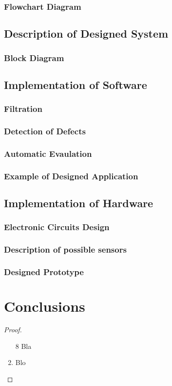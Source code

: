 \documentclass[twoside]{ctuthesis}
\theoremstyle{plain}
\theoremstyle{definition}
\theoremstyle{note}
\begin{document}
\subsection{Flowchart Diagram}
\section{Description of Designed System}
\subsection{Block Diagram}
\section{Implementation of Software}
\subsection{Filtration}
\subsection{Detection of Defects}
\subsection{Automatic Evaulation}
\subsection{Example of Designed Application}
\section{Implementation of Hardware}
\subsection{Electronic Circuits Design}
\subsection{Description of possible sensors}
\subsection{Designed Prototype}
\chapter{Conclusions}


\medskip

\begin{proof}\begin{enumerate} \item[8] Bla \item Blo \end{enumerate} \end{proof}

\appendix

\printindex

\appendix

%



\end{document}
